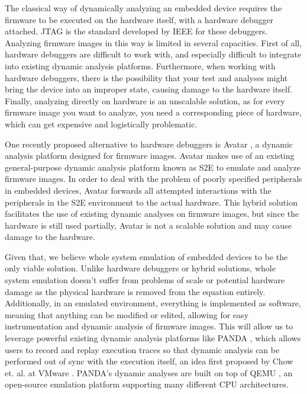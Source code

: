 \documentclass[letterpaper, 10 pt, conference]{ieeeconf}
\begin{document}
The classical way of dynamically analyzing an embedded device requires the firmware to be executed on the hardware itself, with a hardware debugger attached. JTAG \cite{jtag} is the standard developed by IEEE for these debuggers. Analyzing firmware images in this way is limited in several capacities. First of all, hardware debuggers are difficult to work with, and especially difficult to integrate into existing dynamic analysis platforms. Furthermore, when working with hardware debuggers, there is the possibility that your test and analyses might bring the device into an improper state, causing damage to the hardware itself. Finally, analyzing directly on hardware is an unscalable solution, as for every firmware image you want to analyze, you need a corresponding piece of hardware, which can get expensive and logistically problematic. 

One recently proposed alternative to hardware debuggers is Avatar \cite{avatar}, a dynamic analysis platform designed for firmware images. Avatar makes use of an existing general-purpose dynamic analysis platform known as S2E \cite{s2e} to emulate and analyze firmware images. In order to deal with the problem of poorly specified peripherals in embedded devices, Avatar forwards all attempted interactions with the peripherals in the S2E environment to the actual hardware. This hybrid solution facilitates the use of existing dynamic analyses on firmware images, but since the hardware is still used partially, Avatar is not a scalable solution and may cause damage to the hardware.

Given that, we believe whole system emulation of embedded devices to be the only viable solution. Unlike hardware debuggers or hybrid solutions, whole system emulation doesn’t suffer from problems of scale or potential hardware damage as the physical hardware is removed from the equation entirely. Additionally, in an emulated environment, everything is implemented as software, meaning that anything can be modified or edited, allowing for easy instrumentation and dynamic analysis of firmware images. This will allow us to leverage powerful existing dynamic analysis platforms like PANDA \cite{panda}, which allows users to record and replay execution traces so that dynamic analysis can be performed out of sync with the execution itself, an idea first proposed by Chow et. al. at VMware \cite{jchow}. PANDA’s dynamic analyses are built on top of QEMU \cite{qemu}, an open-source emulation platform supporting many different CPU architectures. 
\end{document}
